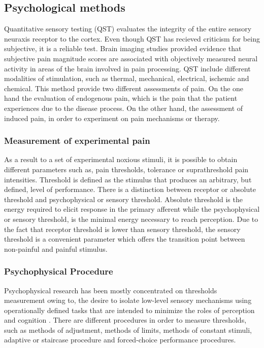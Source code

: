 \subsection{Psychological methods}
Quantitative sensory testing (QST) evaluates the integrity of the entire sensory neuraxis receptor to the cortex. Even though QST has recieved criticism for being subjective, it is a reliable test. Brain imaging studies provided evidence that subjective pain magnitude scores are associated with objectively measured neural activity in areas of the brain involved in pain processing. QST include different modalities of stimulation, such as thermal, mechanical, electrical, ischemic and chemical. This method provide two different assessments of pain. On the one hand the  evaluation of endogenous pain, which is the pain that the patient experiences due to the disease process. On the other hand, the assessment of induced pain, in order to experiment on pain mechanisms or therapy. \cite{Yarnitsky2006}


\subsubsection{Measurement of experimental pain}
As a result to a set of experimental noxious stimuli, it is possible to obtain different parameters such as, pain thresholds, tolerance or suprathreshold pain intensities. Threshold is defined as the stimulus that produces an arbitrary, but defined, level of performance. There is a distinction between receptor or absolute threshold and psychophysical or sensory threshold. Absolute threshold is the energy required to elicit response in the primary afferent while the psychophysical or sensory threshold, is the minimal energy necessary to reach perception. Due to the fact that receptor threshold is lower than sensory threshold, the sensory threshold is a convenient parameter which offers the transition point between non-painful and painful stimulus. \cite{Yarnitsky2006}

\subsubsection{Psychophysical Procedure}
Psychophysical research has been mostly concentrated on thresholds measurement owing to, the desire to isolate low-level sensory mechanisms using operationally defined tasks that are intended to minimize the roles of perception and cognition \cite{Pelli2010}. There are different procedures in order to measure thresholds, such as methods of adjustment, methods of limits, methods of constant stimuli, adaptive or staircase procedure and forced-choice performance procedures. 

